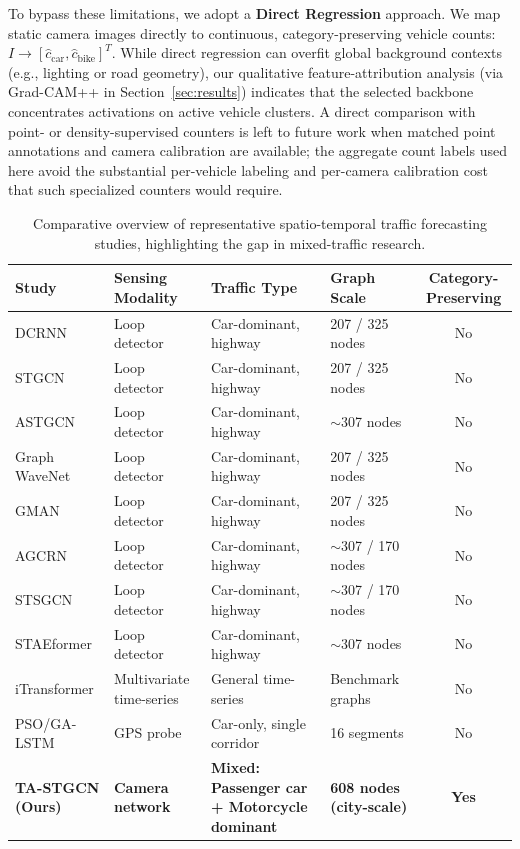 \documentclass[journal,twocolumn]{IEEEtran}
\begin{document}
To bypass these limitations, we adopt a \textbf{Direct Regression} approach. We map static camera images directly to continuous, category-preserving vehicle counts: $I \to [\hat{c}_{\text{car}}, \hat{c}_{\text{bike}}]^T$. While direct regression can overfit global background contexts (e.g., lighting or road geometry), our qualitative feature-attribution analysis (via Grad-CAM++ in Section~\ref{sec:results}) indicates that the selected backbone concentrates activations on active vehicle clusters. A direct comparison with point- or density-supervised counters is left to future work when matched point annotations and camera calibration are available; the aggregate count labels used here avoid the substantial per-vehicle labeling and per-camera calibration cost that such specialized counters would require.

\begin{table}[ht]
\centering
\caption{Comparative overview of representative spatio-temporal traffic forecasting studies, highlighting the gap in mixed-traffic research.}
\label{tab:related_comparison}
\small
\begin{tabular}{llllc}
\toprule
\textbf{Study} & \textbf{Sensing Modality} & \textbf{Traffic Type} & \textbf{Graph Scale} & \textbf{Category-Preserving} \\
\midrule
DCRNN \cite{dcrnn} & Loop detector & Car-dominant, highway & 207 / 325 nodes & No \\
STGCN \cite{stgcn} & Loop detector & Car-dominant, highway & 207 / 325 nodes & No \\
ASTGCN \cite{astgcn} & Loop detector & Car-dominant, highway & $\sim$307 nodes & No \\
Graph WaveNet \cite{wavenet} & Loop detector & Car-dominant, highway & 207 / 325 nodes & No \\
GMAN \cite{gman} & Loop detector & Car-dominant, highway & 207 / 325 nodes & No \\
AGCRN \cite{agcrn} & Loop detector & Car-dominant, highway & $\sim$307 / 170 nodes & No \\
STSGCN \cite{stsgcn} & Loop detector & Car-dominant, highway & $\sim$307 / 170 nodes & No \\
STAEformer \cite{staeformer} & Loop detector & Car-dominant, highway & $\sim$307 nodes & No \\
iTransformer \cite{itransformer} & Multivariate time-series & General time-series & Benchmark graphs & No \\
PSO/GA-LSTM \cite{vnlstm} & GPS probe & Car-only, single corridor & 16 segments & No \\
\midrule
\textbf{TA-STGCN (Ours)} & \textbf{Camera network} & \textbf{Mixed: Passenger car + Motorcycle dominant} & \textbf{608 nodes (city-scale)} & \textbf{Yes} \\
\bottomrule
\end{tabular}
\end{table}
\end{document}
